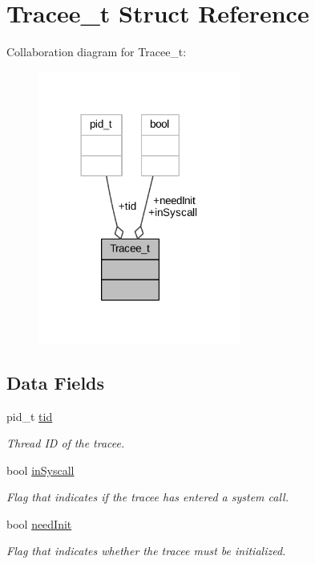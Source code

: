 \hypertarget{struct_tracee__t}{}\section{Tracee\+\_\+t Struct Reference}
\label{struct_tracee__t}


Collaboration diagram for Tracee\+\_\+t\+:
\nopagebreak
\begin{figure}[H]
\begin{center}
\leavevmode
\includegraphics[width=189pt]{struct_tracee__t__coll__graph}
\end{center}
\end{figure}
\subsection*{Data Fields}
\begin{DoxyCompactItemize}
\item 
pid\+\_\+t \hyperlink{struct_tracee__t_a423f0e6a8bff7c3710fb37fc17a4e24c}{tid}
\begin{DoxyCompactList}\small\item\em Thread ID of the tracee. \end{DoxyCompactList}\item 
bool \hyperlink{struct_tracee__t_aa4ce91b02bfa65b9450c236f082bd60a}{in\+Syscall}
\begin{DoxyCompactList}\small\item\em Flag that indicates if the tracee has entered a system call. \end{DoxyCompactList}\item 
bool \hyperlink{struct_tracee__t_ac7e5e2ea5dd53a5f9fd1a2904c322ed4}{need\+Init}
\begin{DoxyCompactList}\small\item\em Flag that indicates whether the tracee must be initialized. \end{DoxyCompactList}\end{DoxyCompactItemize}


